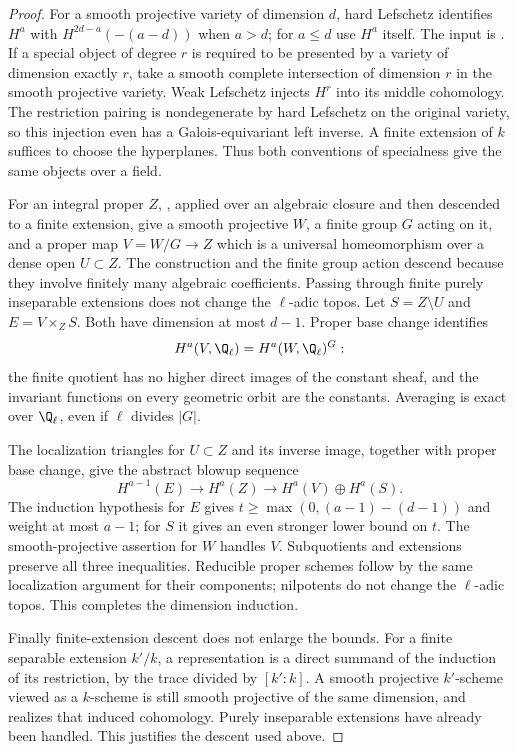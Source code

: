 \begin{proof}
For a smooth projective variety of dimension $d$, hard Lefschetz identifies $H^a$ with $H^{2d-a}(-(a-d))$ when $a>d$; for $a\leq d$ use $H^a$ itself. The input is \citet[Theorem 4.1.1]{c_deligneweil1980}. If a special object of degree $r$ is required to be presented by a variety of dimension exactly $r$, take a smooth complete intersection of dimension $r$ in the smooth projective variety. Weak Lefschetz injects $H^r$ into its middle cohomology. The restriction pairing is nondegenerate by hard Lefschetz on the original variety, so this injection even has a Galois-equivariant left inverse. A finite extension of $k$ suffices to choose the hyperplanes. Thus both conventions of specialness give the same objects over a field.

For an integral proper $Z$, \citet[Theorem 7.3 and Corollary 7.4]{c_dejong1996}, applied over an algebraic closure and then descended to a finite extension, give a smooth projective $W$, a finite group $G$ acting on it, and a proper map $V=W/G\to Z$ which is a universal homeomorphism over a dense open $U\subset Z$. The construction and the finite group action descend because they involve finitely many algebraic coefficients. Passing through finite purely inseparable extensions does not change the \(\ell\)-adic topos. Let $S=Z\setminus U$ and $E=V\times_ZS$. Both have dimension at most $d-1$. Proper base change identifies
\[
 H^a(V,\Q_\ell)=H^a(W,\Q_\ell)^G:
\]
the finite quotient has no higher direct images of the constant sheaf, and the invariant functions on every geometric orbit are the constants. Averaging is exact over $\Q_\ell$, even if $\ell$ divides $|G|$.

The localization triangles for $U\subset Z$ and its inverse image, together with proper base change, give the abstract blowup sequence
\[
 H^{a-1}(E)\longrightarrow H^a(Z)
 \longrightarrow H^a(V)\oplus H^a(S).
\]
The induction hypothesis for $E$ gives $t\geq\max(0,(a-1)-(d-1))$ and weight at most $a-1$; for $S$ it gives an even stronger lower bound on $t$. The smooth-projective assertion for $W$ handles $V$. Subquotients and extensions preserve all three inequalities. Reducible proper schemes follow by the same localization argument for their components; nilpotents do not change the \(\ell\)-adic topos. This completes the dimension induction.

Finally finite-extension descent does not enlarge the bounds. For a finite separable extension $k'/k$, a representation is a direct summand of the induction of its restriction, by the trace divided by $[k':k]$. A smooth projective $k'$-scheme viewed as a $k$-scheme is still smooth projective of the same dimension, and realizes that induced cohomology. Purely inseparable extensions have already been handled. This justifies the descent used above.
\end{proof}

